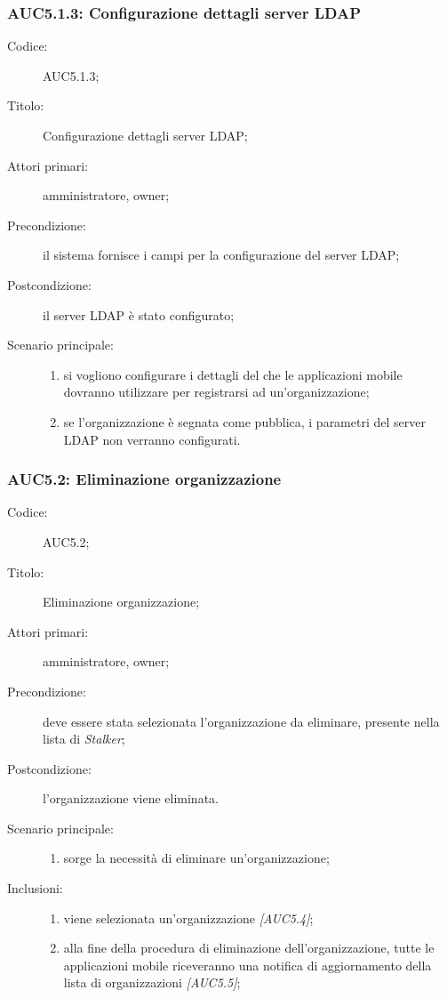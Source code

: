 \documentclass[../../../analisi-dei-requisiti.tex]{subfiles}
\begin{document}
\subsubsection{AUC5.1.3: Configurazione dettagli server LDAP}%
\label{subs:AUC5.1.3}
\begin{description}
  \item[Codice:] AUC5.1.3;
  \item[Titolo:] Configurazione dettagli server LDAP;
  \item[Attori primari:] amministratore, owner;
  \item[Precondizione:] il sistema fornisce i campi per la configurazione del server LDAP;
  \item[Postcondizione:] il server LDAP è stato configurato;
  \item[Scenario principale:]
        \begin{enumerate}
          \item si vogliono configurare i dettagli del  che le applicazioni mobile dovranno utilizzare per registrarsi ad un'organizzazione;
          \item se l'organizzazione è segnata come pubblica, i parametri del server LDAP non verranno configurati.
        \end{enumerate}
\end{description}

\subsubsection{AUC5.2: Eliminazione organizzazione}%
\label{subs:AUC5.2}
\begin{description}
  \item[Codice:] AUC5.2;
  \item[Titolo:] Eliminazione organizzazione;
  \item[Attori primari:] amministratore, owner;
  \item[Precondizione:] deve essere stata selezionata l'organizzazione da eliminare, presente nella lista di \emph{Stalker};
  \item[Postcondizione:] l'organizzazione viene eliminata.
  \item[Scenario principale:]
        \begin{enumerate}
          \item sorge la necessità di eliminare un'organizzazione;
        \end{enumerate}
  \item[Inclusioni:]
        \begin{enumerate}
          \item viene selezionata un'organizzazione \emph{[AUC5.4]};
          \item alla fine della procedura di eliminazione dell'organizzazione, tutte le applicazioni mobile riceveranno una notifica di aggiornamento della lista di organizzazioni \emph{[AUC5.5]};
        \end{enumerate}
\end{description}
\end{document}
